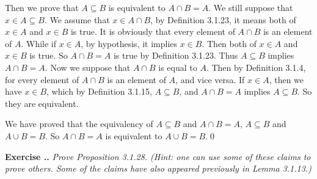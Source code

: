 \documentclass{book}
\newcounter{Exercise}[section]
\renewcommand{\theExercise}{\thesection.\arabic{Exercise}.}
\newcommand{\new}{\vspace{1.5em}\noindent\textbf{{Exercise \stepcounter{Exercise}\textbf{\theExercise}}} }
\begin{document}
Then we prove that $A\subseteq B$ is equivalent to $A\cap B=A$. We still suppose that $x\in A\subseteq B$. We assume that $x\in A\cap B$, by Definition 3.1.23, it means both of $x\in A$ and $x\in B$ is true. It is obviously that every element of $A\cap B$ is an element of $A$. While if $x\in A$, by hypothesis, it implies $x\in B$. Then both of $x\in A$ and $x\in B$ is true. So $A\cap B=A$ is true by Definition 3.1.23. Thus $A\subseteq B$ implies $A\cap B=A$. Now we suppose that $A\cap B$ is equal to $A$. Then by Definition 3.1.4, for every element of $A\cap B$ is an element of $A$, and vice versa. If $x\in A$, then we have $x\in B$, which by Definition 3.1.15, $A\subseteq B$, and $A\cap B=A$ implies $A\subseteq B$. So they are equivalent.

We have proved that the equivalency of $A\subseteq B$ and $A\cap B=A$, $A\subseteq B$ and $A\cup B=B$. So $A\cap B=A$ is equivalent to $A\cup B=B$.\qed 

\new\emph{Prove Proposition 3.1.28. (Hint: one can use some of these claims to prove others. Some of the claims have also appeared previously in Lemma 3.1.13.)}
\end{document}
